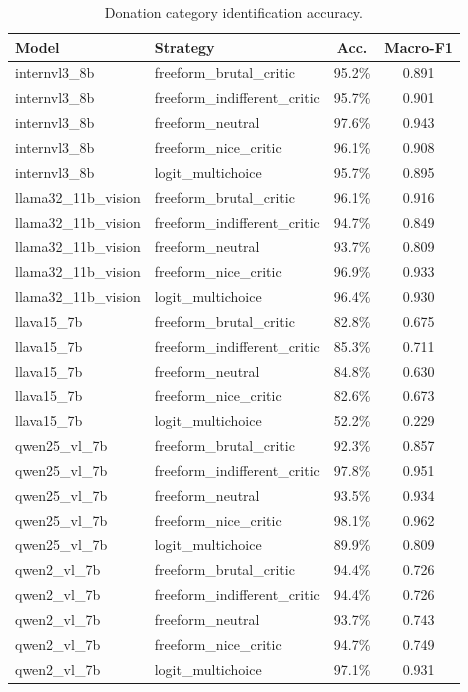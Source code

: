 \begin{table}[!htbp]
\centering
\caption{Donation category identification accuracy.}
\label{tab:donation_models}
\begin{tabular}{@{}llcc@{}}
\toprule
\textbf{Model} & \textbf{Strategy} & \textbf{Acc.} & \textbf{Macro-F1} \\
\midrule
internvl3\_8b & freeform\_brutal\_critic & 95.2\% & 0.891 \\
internvl3\_8b & freeform\_indifferent\_critic & 95.7\% & 0.901 \\
internvl3\_8b & freeform\_neutral & 97.6\% & 0.943 \\
internvl3\_8b & freeform\_nice\_critic & 96.1\% & 0.908 \\
internvl3\_8b & logit\_multichoice & 95.7\% & 0.895 \\
llama32\_11b\_vision & freeform\_brutal\_critic & 96.1\% & 0.916 \\
llama32\_11b\_vision & freeform\_indifferent\_critic & 94.7\% & 0.849 \\
llama32\_11b\_vision & freeform\_neutral & 93.7\% & 0.809 \\
llama32\_11b\_vision & freeform\_nice\_critic & 96.9\% & 0.933 \\
llama32\_11b\_vision & logit\_multichoice & 96.4\% & 0.930 \\
llava15\_7b & freeform\_brutal\_critic & 82.8\% & 0.675 \\
llava15\_7b & freeform\_indifferent\_critic & 85.3\% & 0.711 \\
llava15\_7b & freeform\_neutral & 84.8\% & 0.630 \\
llava15\_7b & freeform\_nice\_critic & 82.6\% & 0.673 \\
llava15\_7b & logit\_multichoice & 52.2\% & 0.229 \\
qwen25\_vl\_7b & freeform\_brutal\_critic & 92.3\% & 0.857 \\
qwen25\_vl\_7b & freeform\_indifferent\_critic & 97.8\% & 0.951 \\
qwen25\_vl\_7b & freeform\_neutral & 93.5\% & 0.934 \\
qwen25\_vl\_7b & freeform\_nice\_critic & 98.1\% & 0.962 \\
qwen25\_vl\_7b & logit\_multichoice & 89.9\% & 0.809 \\
qwen2\_vl\_7b & freeform\_brutal\_critic & 94.4\% & 0.726 \\
qwen2\_vl\_7b & freeform\_indifferent\_critic & 94.4\% & 0.726 \\
qwen2\_vl\_7b & freeform\_neutral & 93.7\% & 0.743 \\
qwen2\_vl\_7b & freeform\_nice\_critic & 94.7\% & 0.749 \\
qwen2\_vl\_7b & logit\_multichoice & 97.1\% & 0.931 \\
\bottomrule
\end{tabular}
\end{table}

